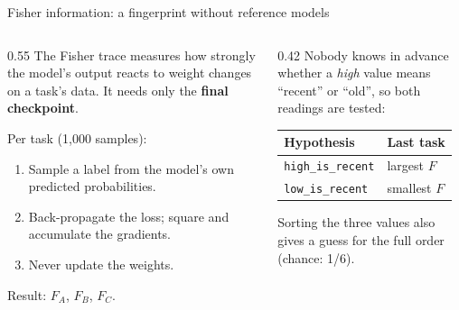 \documentclass[aspectratio=169,11pt]{beamer}
\newcommand{\hl}[1]{{\color{accent}\bfseries #1}}
\begin{document}
\begin{frame}{Fisher information: a fingerprint without reference models}
  \begin{columns}[T]
    \begin{column}{0.55\textwidth}
      The Fisher trace measures how strongly the model's output reacts to weight changes on a task's data. It needs only the \hl{final checkpoint}.

      \medskip
      Per task (1{,}000 samples):
      \begin{enumerate}
        \item Sample a label from the model's own predicted probabilities.
        \item Back-propagate the loss; square and accumulate the gradients.
        \item Never update the weights.
      \end{enumerate}
      Result: $F_A$, $F_B$, $F_C$.
    \end{column}
    \begin{column}{0.42\textwidth}
      Nobody knows in advance whether a \emph{high} value means ``recent'' or ``old'', so both readings are tested:
      \medskip

      \small
      \begin{tabular}{@{}ll@{}}
        \toprule
        \textbf{Hypothesis} & \textbf{Last task}\\
        \midrule
        \texttt{high\_is\_recent} & largest $F$\\
        \texttt{low\_is\_recent} & smallest $F$\\
        \bottomrule
      \end{tabular}

      \medskip
      Sorting the three values also gives a guess for the full order (chance: 1/6).
    \end{column}
  \end{columns}
\end{frame}
\end{document}
